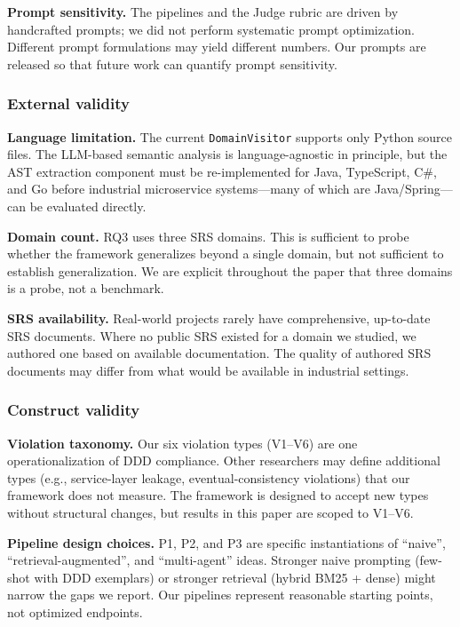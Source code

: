 \documentclass[smallextended]{svjour3}
\begin{document}
\textbf{Prompt sensitivity.}
The pipelines and the Judge rubric are driven by handcrafted prompts; we did not perform systematic prompt optimization.
Different prompt formulations may yield different numbers.
Our prompts are released so that future work can quantify prompt sensitivity.

\subsubsection{External validity}

\textbf{Language limitation.}
The current \texttt{DomainVisitor} supports only Python source files.
The LLM-based semantic analysis is language-agnostic in principle, but the AST extraction component must be re-implemented for Java, TypeScript, C\#, and Go before industrial microservice systems---many of which are Java/Spring---can be evaluated directly.

\textbf{Domain count.}
RQ3 uses three SRS domains.
This is sufficient to probe whether the framework generalizes beyond a single domain, but not sufficient to establish generalization.
We are explicit throughout the paper that three domains is a probe, not a benchmark.

\textbf{SRS availability.}
Real-world projects rarely have comprehensive, up-to-date SRS documents.
Where no public SRS existed for a domain we studied, we authored one based on available documentation.
The quality of authored SRS documents may differ from what would be available in industrial settings.

\subsubsection{Construct validity}

\textbf{Violation taxonomy.}
Our six violation types (V1--V6) are one operationalization of DDD compliance.
Other researchers may define additional types (e.g., service-layer leakage, eventual-consistency violations) that our framework does not measure.
The framework is designed to accept new types without structural changes, but results in this paper are scoped to V1--V6.

\textbf{Pipeline design choices.}
P1, P2, and P3 are specific instantiations of ``naive'', ``retrieval-augmented'', and ``multi-agent'' ideas.
Stronger naive prompting (few-shot with DDD exemplars) or stronger retrieval (hybrid BM25 + dense) might narrow the gaps we report.
Our pipelines represent reasonable starting points, not optimized endpoints.
\end{document}
